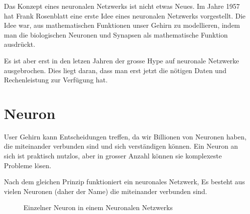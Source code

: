 \documentclass[12pt,a4paper]{report}
\begin{document}
Das Konzept eines neuronalen Netzwerks ist nicht etwas Neues.
Im Jahre 1957 hat Frank Rosenblatt eine erste Idee eines neuronalen Netzwerks vorgestellt.
Die Idee war, aus mathematischen Funktionen unser Gehirn zu modellieren,
indem man die biologischen Neuronen und Synapsen als mathematische Funktion ausdrückt.

Es ist aber erst in den letzen Jahren der grosse Hype auf neuronale Netzwerke ausgebrochen.
Dies liegt daran, dass man erst jetzt die nötigen Daten
und Rechenleistung zur Verfügung hat.

\section{Neuron}\label{sec:neuron}
User Gehirn kann Entscheidungen treffen, da wir Billionen von Neuronen haben, die miteinander verbunden sind und sich
verständigen können.
Ein Neuron an sich ist praktisch nutzlos, aber in grosser Anzahl können sie komplexeste Probleme lösen.

Nach dem gleichen Prinzip funktioniert ein neuronales Netzwerk,
Es besteht aus vielen Neuronen (daher der Name) die miteinander verbunden sind.


\begin{figure}[h]
    \centering
{}
    \caption{Einzelner Neuron in einem Neuronalen Netzwerks}
    \label{fig:neuron1}
\end{figure}
\end{document}
